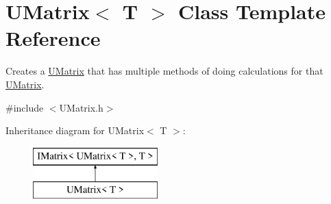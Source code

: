 \hypertarget{class_u_matrix}{}\section{U\+Matrix$<$ T $>$ Class Template Reference}
\label{class_u_matrix}


Creates a \mbox{\hyperlink{class_u_matrix}{U\+Matrix}} that has multiple methods of doing calculations for that \mbox{\hyperlink{class_u_matrix}{U\+Matrix}}.  




{\ttfamily \#include $<$U\+Matrix.\+h$>$}

Inheritance diagram for U\+Matrix$<$ T $>$\+:\begin{figure}[H]
\begin{center}
\leavevmode
\includegraphics[height=2.000000cm]{class_u_matrix}
\end{center}
\end{figure}
